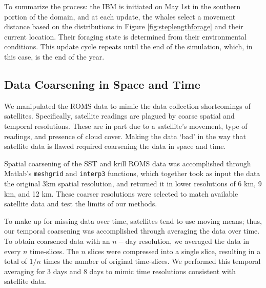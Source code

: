 \documentclass[11pt]{article}
\begin{document}


To summarize the process: the IBM is initiated on May 1st in the southern portion of the domain, and at each update, the whales select a movement distance based on the distributions in Figure \ref{fig:steplengthforage} and their current location. Their foraging state is determined from their environmental conditions. This update cycle repeats until the end of the simulation, which, in this case, is the end of the year.\par

\subsection{Data Coarsening in Space and Time}
We manipulated the ROMS data to mimic the data collection shortcomings of satellites. Specifically, satellite readings are plagued by coarse spatial and temporal resolutions. These are in part due to a satellite's movement, type of readings, and presence of cloud cover. Making the data ‘bad’ in the way that satellite data is flawed required coarsening the data in space and time. \par 

Spatial coarsening of the SST and krill ROMS data was accomplished through Matlab’s \texttt{meshgrid} and \texttt{interp3} functions, which together took as input the data the original 3km spatial resolution, and returned it in lower resolutions of 6 km, 9 km, and 12 km. These coarser resolutions were selected to match available satellite data and test the limits of our methods.\par 

To make up for missing data over time, satellites tend to use moving means; thus, our temporal coarsening was accomplished through averaging the data over time. To obtain coarsened data with an $n-$day resolution, we averaged the data in every $n$ time-slices. The $n$ slices were compressed into a single slice, resulting in a total of $1/n$ times the number of original time-slices. We performed this temporal averaging for 3 days and 8 days to mimic time resolutions consistent with satellite data. \par 
\end{document}
